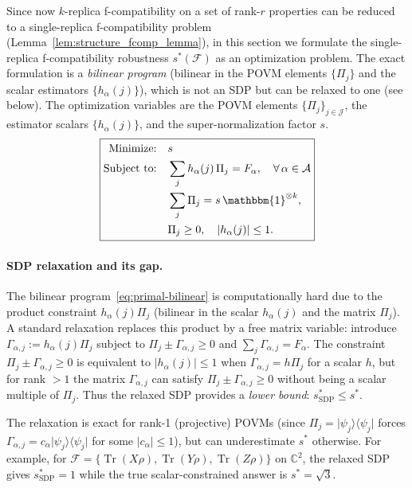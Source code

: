 \documentclass[aps,%
twocolumn,%
floatfix,%
pra,%
amsfonts,%
groupedaddress,%
superscriptaddress]{revtex4-2}%
\DeclareMathOperator{\tr}{Tr}
\newcommand{\proj}[1]{\lvert #1\rangle\!\langle #1\rvert}
\newcommand{\ox}{\otimes}
\newcommand{\1}{\mathbbm{1}}
\newcommand*{\cF}{\mathcal{F}}
\newcommand*{\cA}{\mathcal{A}}
\newcommand*{\cJ}{\mathcal{J}}
\begin{document}
\color{red}Since now $k$-replica f-compatibility on a set of rank-$r$ properties can be reduced to a single-replica f-compatibility problem (Lemma~\ref{lem:structure_fcomp_lemma}), in this section we formulate the single-replica f-compatibility robustness $s^*(\cF)$ as an optimization problem.
The exact formulation is a \emph{bilinear program} (bilinear in the POVM elements $\{\Pi_j\}$ and the scalar estimators $\{h_\alpha(j)\}$), which is not an SDP but can be relaxed to one (see below).\color{black}
The optimization variables are the POVM elements $\{\Pi_j\}_{j\in\cJ}$, the estimator scalars $\{h_\alpha(j)\}$, and the super-normalization factor $s$.
\begin{equation}\label{eq:primal-bilinear}
\boxed{
\begin{aligned}
\text{Minimize:} \quad & s \\
\text{Subject to:} \quad & \sum_{j} h_\alpha(j)\,\Pi_j = F_\alpha, \quad \forall\,\alpha \in \cA \\
& \sum_j \Pi_j = s\,\1^{\ox k},\\
& \Pi_j \geq 0, \quad |h_\alpha(j)| \leq 1.\\
\end{aligned}
}
\end{equation}


\color{red}
\paragraph{SDP relaxation and its gap.}
The bilinear program~\eqref{eq:primal-bilinear} is computationally hard due to the product constraint $h_\alpha(j)\Pi_j$ (bilinear in the scalar $h_\alpha(j)$ and the matrix $\Pi_j$). A standard relaxation replaces this product by a free matrix variable: introduce $\Gamma_{\alpha,j} := h_\alpha(j)\Pi_j$ subject to $\Pi_j \pm \Gamma_{\alpha,j} \geq 0$ and $\sum_j \Gamma_{\alpha,j} = F_\alpha$. The constraint $\Pi_j \pm \Gamma_{\alpha,j} \geq 0$ is equivalent to $|h_\alpha(j)| \leq 1$ when $\Gamma_{\alpha,j} = h\Pi_j$ for a scalar $h$, but for rank $>1$ the matrix $\Gamma_{\alpha,j}$ can satisfy $\Pi_j \pm \Gamma_{\alpha,j} \geq 0$ without being a scalar multiple of $\Pi_j$. Thus the relaxed SDP provides a \emph{lower bound}: $s^*_{\mathrm{SDP}} \leq s^*$.

The relaxation is exact for rank-1 (projective) POVMs (since $\Pi_j = \proj{\psi_j}$ forces $\Gamma_{\alpha,j} = c_\alpha \proj{\psi_j}$ for some $|c_\alpha| \leq 1$), but can underestimate $s^*$ otherwise. For example, for $\cF = \{\tr(X\rho), \tr(Y\rho), \tr(Z\rho)\}$ on $\mathbb{C}^2$, the relaxed SDP gives $s^*_{\mathrm{SDP}} = 1$ while the true scalar-constrained answer is $s^* = \sqrt{3}$.
\end{document}
